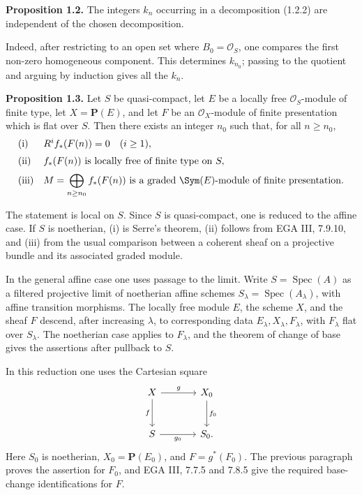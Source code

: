 \documentclass[11pt]{article}
\newcommand{\Spec}{\operatorname{Spec}}
\begin{document}
\textbf{Proposition 1.2.} The integers \(k_n\) occurring in a decomposition (1.2.2) are independent of the chosen decomposition.

Indeed, after restricting to an open set where \(B_0=\mathcal O_S\), one compares the first non-zero homogeneous component. This determines \(k_{n_0}\); passing to the quotient and arguing by induction gives all the \(k_n\).

\textbf{Proposition 1.3.} Let \(S\) be quasi-compact, let \(E\) be a locally free \(\mathcal O_S\)-module of finite type, let \(X=\mathbf P(E)\), and let \(F\) be an \(\mathcal O_X\)-module of finite presentation which is flat over \(S\). Then there exists an integer \(n_0\) such that, for all \(n\geq n_0\),
\[
\begin{array}{ll}
\text{\rm (i)}& R^i f_*(F(n))=0\quad (i\geq 1),\\[2mm]
\text{\rm (ii)}& f_*(F(n))\text{ is locally free of finite type on }S,\\[2mm]
\text{\rm (iii)}& \displaystyle M=\bigoplus_{n\geq n_0} f_*(F(n))
\text{ is a graded }\Sym(E)\text{-module of finite presentation.}
\end{array}
\]

The statement is local on \(S\). Since \(S\) is quasi-compact, one is reduced to the affine case. If \(S\) is noetherian, (i) is Serre's theorem, (ii) follows from EGA III, 7.9.10, and (iii) from the usual comparison between a coherent sheaf on a projective bundle and its associated graded module.

In the general affine case one uses passage to the limit. Write \(S=\Spec(A)\) as a filtered projective limit of noetherian affine schemes \(S_\lambda=\Spec(A_\lambda)\), with affine transition morphisms. The locally free module \(E\), the scheme \(X\), and the sheaf \(F\) descend, after increasing \(\lambda\), to corresponding data \(E_\lambda,X_\lambda,F_\lambda\), with \(F_\lambda\) flat over \(S_\lambda\). The noetherian case applies to \(F_\lambda\), and the theorem of change of base gives the assertions after pullback to \(S\).

In this reduction one uses the Cartesian square
\[
\begin{tikzcd}[column sep=large,row sep=large]
X \arrow[r,"g"] \arrow[d,"f"'] & X_0 \arrow[d,"f_0"]\\
S \arrow[r,"g_0"'] & S_0 .
\end{tikzcd}
\]
Here \(S_0\) is noetherian, \(X_0=\mathbf P(E_0)\), and \(F=g^*(F_0)\). The previous paragraph proves the assertion for \(F_0\), and EGA III, 7.7.5 and 7.8.5 give the required base-change identifications for \(F\).
\end{document}
